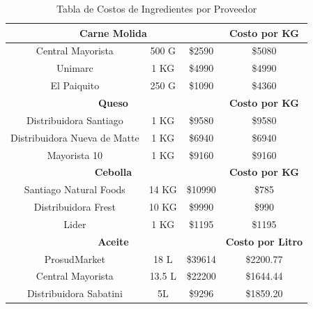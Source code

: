 \documentclass[12pt]{article}
\begin{document}
\begin{table}[H]
\begin{tabular}{|| c | c | c | c||}
        \multicolumn{3}{||c|}{\textbf{Carne Molida}} & \textbf{Costo por KG} \\ [0.5ex] \hline \hline %
        Central Mayorista & 500 G & \$2590 & \$5080 \\ \hline 
        Unimarc & 1 KG & \$4990 & \$4990 \\ \hline 
        El Paiquito & 250 G & \$1090 & \$4360 \\ [1ex] \hline \hline


        \multicolumn{3}{||c|}{\textbf{Queso}} & \textbf{Costo por KG} \\ [0.5ex] \hline \hline %
        Distribuidora Santiago & 1 KG & \$9580 & \$9580 \\ \hline
        Distribuidora Nueva de Matte & 1 KG & \$6940 & \$6940 \\ \hline
        Mayorista 10 & 1 KG & \$9160 & \$9160 \\ [1ex] \hline \hline

        \multicolumn{3}{||c|}{\textbf{Cebolla}} & \textbf{Costo por KG} \\ [0.5ex] \hline \hline %
        Santiago Natural Foods & 14 KG & \$10990 & \$785 \\ \hline
        Distribuidora Frest & 10 KG & \$9990 & \$990 \\ \hline
        Lider & 1 KG & \$1195 & \$1195 \\ [1ex] \hline \hline

        \multicolumn{3}{||c|}{\textbf{Aceite}} & \textbf{Costo por Litro} \\ [0.5ex] \hline \hline
        ProsudMarket & 18 L & \$39614 & \$2200.77 \\ \hline
        Central Mayorista & 13.5 L & \$22200 & \$1644.44 \\ \hline
        Distribuidora Sabatini & 5L & \$9296 & \$1859.20 \\ [1ex] \hline \hline

    \end{tabular}
    \caption{Tabla de Costos de Ingredientes por Proveedor}
    \label{tab:costos_ingredientes_proveedor}
\end{table} %
\newpage
\end{document}
